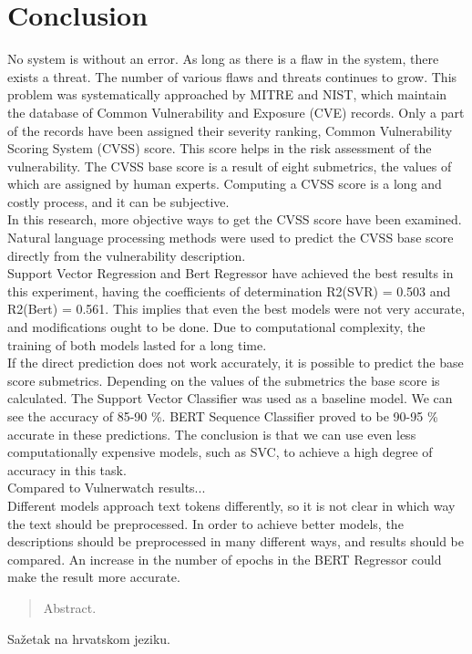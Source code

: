 \documentclass[times, utf8, zavrsni, english]{fer}
\begin{document}
\chapter{Conclusion}
No system is without an error. As long as there is a flaw in the system, there exists a threat. The number of various flaws and threats continues to grow. This problem was systematically approached by MITRE and NIST, which maintain the database of Common Vulnerability and Exposure (CVE) records. Only a part of the records have been assigned their severity ranking, Common Vulnerability Scoring System (CVSS) score. This score helps in the risk assessment of the vulnerability. The CVSS base score is a result of eight submetrics, the values of which are assigned by human experts. Computing a CVSS score is a long and costly process, and it can be subjective. \\

In this research, more objective ways to get the CVSS score have been examined. Natural language processing methods were used to predict the CVSS base score directly from the vulnerability description.\\
Support Vector Regression and Bert Regressor have achieved the best results in this experiment, having the coefficients of determination R2(SVR) = 0.503 and R2(Bert) = 0.561. This implies that even the best models were not very accurate, and modifications ought to be done. Due to computational complexity, the training of both models lasted for a long time. \\
If the direct prediction does not work accurately, it is possible to predict the base score submetrics. Depending on the values of the submetrics the base score is calculated. The Support Vector Classifier was used as a baseline model. We can see the accuracy of 85-90 \%. BERT Sequence Classifier proved to be 90-95 \% accurate in these predictions. The conclusion is that we can use even less computationally expensive models, such as SVC, to achieve a high degree of accuracy in this task.\\
Compared to Vulnerwatch results...\\

Different models approach text tokens differently, so it is not clear in which way the text should be preprocessed. 
In order to achieve better models, the descriptions should be preprocessed in many different ways, and results should be compared.
An increase in the number of epochs in the BERT Regressor could make the result more accurate. 




\listoffigures
\begin{abstract}
Abstract.

\end{abstract}

\begin{sazetak}
Sažetak na hrvatskom jeziku.

\end{sazetak}
\end{document}
